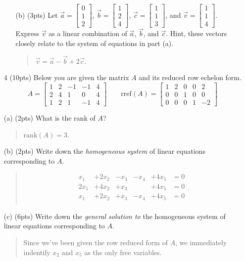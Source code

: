 \documentclass{article}
\newcommand{\Rank}{\mathrm{rank}}
\newcommand{\mat}[1]{\begin{bmatrix}#1\end{bmatrix}}
\begin{document}
\begin{enumerate}
\begin{enumerate}
		\item[(b) (3pts)] Let $\vec a=\mat{0\\1\\2}$, $\vec b=\mat{1\\2\\4}$, $\vec c=\mat{1\\1\\3}$, and $\vec v=\mat{1\\1\\4}$.
			Express $\vec v$ as a linear combination of $\vec a$, $\vec b$, and $\vec c$. Hint, these vectors 
			closely relate to the system of equations in part (a).
			\begin{quote}
				$\vec v=\vec a-\vec b+2\vec c$.
			\end{quote}
	\end{enumerate}
	\clearpage

	\item[4 (10pts)] Below you are given the matrix $A$ and its reduced row echelon form.
		\[
			A=\mat{
				1 &  2 & -1 & -1 &  4\\
				2 &  4 &  1 &  0 &  4\\
				1 &  2 &  1 & -1 &  4
				   }\qquad
				\mathrm{rref}(A)=\mat{
				 1 &  2 &  0 &  0 &  2\\
				 0 &  0 &  1 &  0 &  0\\
				0 &  0 &  0 &  1 & -2}
		\]
		\item[(a) (2pts)]
			What is the rank of $A$?
			\begin{quote}
				$\Rank(A)=3$.
			\end{quote}

		\vspace{.5in}

	\item[(b) (2pts)] Write down the \emph{homogeneous system} of linear equations corresponding
			to $A$.
			\begin{quote}
				\[\begin{array}{rrrrrc}
						x_1&+2x_2&-x_3&-x_4&+4x_5&=0\\
						2x_1&+4x_2&+x_3& &+4x_5&=0\\
						x_1&+2x_2&+x_3&-x_4&+4x_5&=0\\
				\end{array}.\]

			\end{quote}

	\item[(c) (6pts)] Write down the \emph{general solution to} the homogeneous system of linear equations corresponding
			to $A$.
			\begin{quote}
				Since we've been given the row reduced form of $A$, we immediately indentify
				$x_2$ and $x_5$ as the only free variables.


\end{quote}
\end{enumerate}
\end{document}
